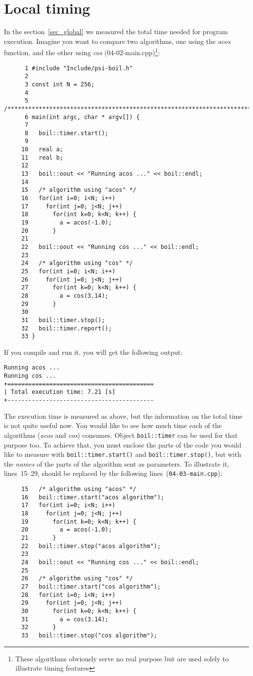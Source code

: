 \section{Local timing}
\label{sec_local}

In the section~\ref{sec_global} we measured the total time needed
for program execution. Imagine you want to compare two algorithms,
one using the {\em acos} function, and the other using {\em cos}
(04-02-main.cpp)\footnote{These algorithms obviously serve no real 
purpose but are used solely to illustrate timing features}:
%
{\small \begin{verbatim}
      1 #include "Include/psi-boil.h"
      2
      3 const int N = 256;
      4
      5 /****************************************************************************/
      6 main(int argc, char * argv[]) {
      7
      8   boil::timer.start();
      9
     10   real a;
     11   real b;
     12
     13   boil::oout << "Running acos ..." << boil::endl;
     14
     15   /* algorithm using "acos" */
     16   for(int i=0; i<N; i++)
     17     for(int j=0; j<N; j++)
     18       for(int k=0; k<N; k++) {
     19         a = acos(-1.0);
     20       }
     21
     22   boil::oout << "Running cos ..." << boil::endl;
     23
     24   /* algorithm using "cos" */
     25   for(int i=0; i<N; i++)
     26     for(int j=0; j<N; j++)
     27       for(int k=0; k<N; k++) {
     28         a = cos(3.14);
     29       }
     30
     31   boil::timer.stop();
     32   boil::timer.report();
     33 }
\end{verbatim}}
%
If you compile and run it, you will get the following output:
%
{\small \begin{verbatim}
Running acos ...
Running cos ...
+==========================================
| Total execution time: 7.21 [s]
+------------------------------------------
\end{verbatim}}
%
The execution time is measured as above, but the information on the 
total time is not quite useful now. You would like to see how much
time each of the algorithms ({\em acos} and {\em cos}) consumes.
Object {\tt boil::timer} can be used for that purpose too. To achieve
that, you must enclose the parts of the code you would like to 
measure with {\tt boil::timer.start()} and {\tt boil::timer.stop()},
but with the {\em names} of the parts of the algorithm sent as
parameters. To illustrate it, lines~15--29, should be replaced by the 
following lines~({\tt 04-03-main.cpp}):
%
{\small \begin{verbatim}
     15   /* algorithm using "acos" */
     16   boil::timer.start("acos algorithm");
     17   for(int i=0; i<N; i++)
     18     for(int j=0; j<N; j++)
     19       for(int k=0; k<N; k++) {
     20         a = acos(-1.0);
     21       }
     22   boil::timer.stop("acos algorithm");
     23
     24   boil::oout << "Running cos ..." << boil::endl;
     25
     26   /* algorithm using "cos" */
     27   boil::timer.start("cos algorithm");
     28   for(int i=0; i<N; i++)
     29     for(int j=0; j<N; j++)
     30       for(int k=0; k<N; k++) {
     31         a = cos(3.14);
     32       }
     33   boil::timer.stop("cos algorithm");
\end{verbatim}}

